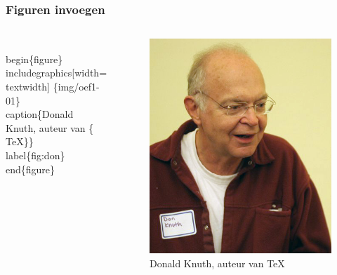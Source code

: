 \documentclass{beamer}
\begin{document}
\begin{frame}[fragile]
  \frametitle{Figuren invoegen}

  \begin{columns}[c]
\begin{semiverbatim}
\alert<1>{\\begin\{figure\}}
  \alert<2>{\\includegraphics[width=\\textwidth]
    \{img/oef1-01\}}
  \alert<3>{\\caption\{Donald Knuth, auteur van
    \{\\TeX\}\}}
  \alert<4>{\\label\{fig:don\}}
\alert<1>{\\end\{figure\}}
\end{semiverbatim}

    \begin{figure}
      \includegraphics[width=\textwidth]{img/oef1-01}
      \caption{Donald Knuth, auteur van {\TeX}}
      \label{fig:don}
    \end{figure}

  \end{columns}

\end{frame}
\end{document}

